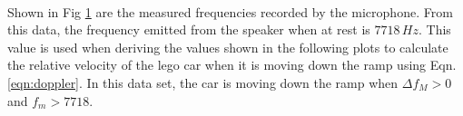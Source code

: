 \documentclass[11pt,a4paper]{article}
\begin{document}
    \begin{figure}[H]%
      \centering
      \\
      \caption{}%
      \label{fig:legocar_fre}%
    \end{figure}

    Shown in Fig \ref{fig:legocar_fre} are the measured frequencies recorded by the microphone. From this data, the frequency emitted from the speaker when at rest is $7718\, Hz$. This value is used when deriving the values shown in the following plots to calculate the relative velocity of the lego car when it is moving down the ramp using Eqn. \ref{eqn:doppler}. In this data set, the car is moving down the ramp when $\Delta f_M > 0$ and $f_m > 7718$.
\end{document}

